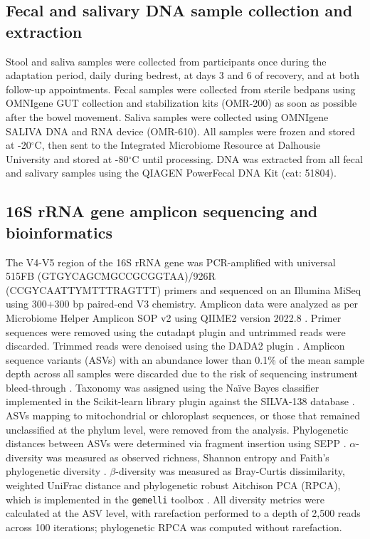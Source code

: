 \documentclass[preprint,12pt,authoryear]{elsarticle}
\begin{document}
\subsection{Fecal and salivary DNA sample collection and extraction}
    
    Stool and saliva samples were collected from participants once during the adaptation period, daily during bedrest, at days 3 and 6 of recovery, and at both follow-up appointments. Fecal samples were collected from sterile bedpans using OMNIgene GUT collection and stabilization kits (OMR-200) as soon as possible after the bowel movement. Saliva samples were collected using OMNIgene SALIVA DNA and RNA device (OMR-610). All samples were frozen and stored at -20$^\circ$C, then sent to the Integrated Microbiome Resource at Dalhousie University and stored at -80$^\circ$C until processing. DNA was extracted from all fecal and salivary samples using the QIAGEN PowerFecal DNA Kit (cat: 51804).

\subsection{16S rRNA gene amplicon sequencing and bioinformatics}

     The V4-V5 region of the 16S rRNA gene was PCR-amplified with universal 515FB (GTGYCAGCMGCCGCGGTAA)/926R (CCGYCAATTYMTTTRAGTTT) primers and sequenced on an Illumina MiSeq using 300+300 bp paired-end V3 chemistry. Amplicon data were analyzed as per Microbiome Helper Amplicon SOP v2 \citep{comeauMicrobiomeHelperCustom2017} using QIIME2 version 2022.8 \citep{bolyenReproducibleInteractiveScalable2019}. Primer sequences were removed using the cutadapt plugin \citep{martinCutadaptRemovesAdapter2011} and untrimmed reads were discarded. Trimmed reads were denoised using the DADA2 plugin \citep{callahanDADA2HighresolutionSample2016}. Amplicon sequence variants (ASVs) with an abundance lower than 0.1\% of the mean sample depth across all samples were discarded due to the risk of sequencing instrument bleed-through \citep{illuminaBestPracticesHigh2013}. Taxonomy was assigned using the Naïve Bayes classifier implemented in the Scikit-learn library plugin \citep{pedregosaScikitlearnMachineLearning2012, bokulichOptimizingTaxonomicClassification2018} against the SILVA-138 database \citep{quastSILVARibosomalRNA2012}. ASVs mapping to mitochondrial or chloroplast sequences, or those that remained unclassified at the phylum level, were removed from the analysis. Phylogenetic distances between ASVs were determined via fragment insertion using SEPP \citep{janssenPhylogeneticPlacementExact2018}. $\alpha$-diversity was measured as observed richness, Shannon entropy \citep{shannonMathematicalTheoryCommunication1948} and Faith's phylogenetic diversity \citep{faithConservationEvaluationPhylogenetic1992}. $\beta$-diversity was measured as Bray-Curtis dissimilarity, weighted UniFrac distance and phylogenetic robust Aitchison PCA (RPCA), which is implemented in the \texttt{gemelli} toolbox \citep{martinoNovelSparseCompositional2019}. All diversity metrics were calculated at the ASV level, with rarefaction performed to a depth of 2,500 reads across 100 iterations; phylogenetic RPCA was computed without rarefaction.
\end{document}
